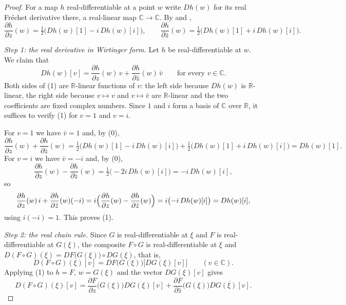 \begin{proof}
For a map $h$ real-differentiable at a point $w$ write $Dh(w)$ for its real
Fr\'echet derivative there, a real-linear map $\mathbb{C}\to\mathbb{C}$.  By
 and ,
\begin{equation}\tag{0}
  \frac{\partial h}{\partial z}(w)=\tfrac12\bigl(Dh(w)[1]-i\,Dh(w)[i]\bigr),
  \qquad
  \frac{\partial h}{\partial\bar z}(w)=\tfrac12\bigl(Dh(w)[1]+i\,Dh(w)[i]\bigr).
\end{equation}

\emph{Step 1: the real derivative in Wirtinger form.}  Let $h$ be
real-differentiable at $w$.  We claim that
\begin{equation}\tag{1}
  Dh(w)[v]
  =\frac{\partial h}{\partial z}(w)\,v
   +\frac{\partial h}{\partial\bar z}(w)\,\bar v
  \qquad\text{for every }v\in\mathbb{C}.
\end{equation}
Both sides of (1) are $\mathbb{R}$-linear functions of $v$: the left side
because $Dh(w)$ is $\mathbb{R}$-linear, the right side because $v\mapsto v$ and
$v\mapsto\bar v$ are $\mathbb{R}$-linear and the two coefficients are fixed
complex numbers.  Since $1$ and $i$ form a basis of $\mathbb{C}$ over
$\mathbb{R}$, it suffices to verify (1) for $v=1$ and $v=i$.

For $v=1$ we have $\bar v=1$ and, by (0),
\[
  \frac{\partial h}{\partial z}(w)+\frac{\partial h}{\partial\bar z}(w)
  =\tfrac12\bigl(Dh(w)[1]-i\,Dh(w)[i]\bigr)+\tfrac12\bigl(Dh(w)[1]+i\,Dh(w)[i]\bigr)
  =Dh(w)[1].
\]
For $v=i$ we have $\bar v=-i$ and, by (0),
\[
  \frac{\partial h}{\partial z}(w)-\frac{\partial h}{\partial\bar z}(w)
  =\tfrac12\bigl(-2i\,Dh(w)[i]\bigr)=-i\,Dh(w)[i],
\]
so
\[
  \frac{\partial h}{\partial z}(w)\,i+\frac{\partial h}{\partial\bar z}(w)(-i)
  =i\Bigl(\frac{\partial h}{\partial z}(w)-\frac{\partial h}{\partial\bar z}(w)\Bigr)
  =i\bigl(-i\,Dh(w)[i]\bigr)=Dh(w)[i],
\]
using $i(-i)=1$.  This proves (1).

\emph{Step 2: the real chain rule.}  Since $G$ is real-differentiable at $\xi$
and $F$ is real-differentiable at $G(\xi)$, the composite $F\circ G$ is
real-differentiable at $\xi$ and
$D(F\circ G)(\xi)=DF\bigl(G(\xi)\bigr)\circ DG(\xi)$, that is,
\[
  D(F\circ G)(\xi)[v]=DF\bigl(G(\xi)\bigr)\bigl[DG(\xi)[v]\bigr]
  \qquad(v\in\mathbb{C}).
\]
Applying (1) to $h=F$, $w=G(\xi)$ and the vector $DG(\xi)[v]$ gives
\begin{equation}\tag{2}
  D(F\circ G)(\xi)[v]
  =\frac{\partial F}{\partial z}\bigl(G(\xi)\bigr)DG(\xi)[v]
   +\frac{\partial F}{\partial\bar z}\bigl(G(\xi)\bigr)\overline{DG(\xi)[v]} .
\end{equation}


\end{proof}
